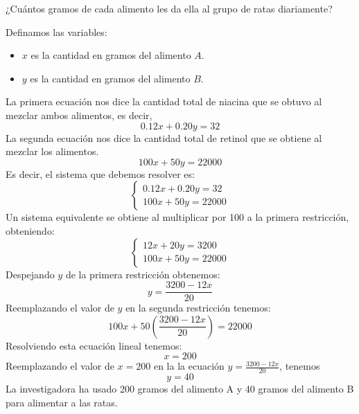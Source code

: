 \documentclass[11pt,respuestas,a4]{aleph-examen}
\begin{document}
\begin{preguntas}
¿Cuántos gramos de cada alimento les da ella al grupo de ratas diariamente? 
\begin{respuesta}
	Definamos las variables:
	\begin{itemize}
		\item[] $x$ es la cantidad en gramos del alimento $A$.
		\item[] $y$ es la cantidad en gramos del alimento $B$.
	\end{itemize}
	La primera ecuaci\'on nos dice la cantidad total de niacina que se obtuvo al mezclar ambos alimentos, es decir,
	$$
	0.12 x + 0.20 y = 32
	$$
	La segunda ecuaci\'on nos dice la cantidad total de retinol que se obtiene al mezclar los alimentos.
	$$
	100 x + 50 y = 22 000
	$$
	Es decir, el sistema que debemos resolver es:
	$$
	\begin{cases}
		0.12 x + 0.20 y = 32 \\
		100 x + 50 y = 22 000
	\end{cases}
	$$
	Un sistema equivalente se obtiene al multiplicar por 100 a la primera restricci\'on, obteniendo:
	$$
	\begin{cases}
		12 x + 20 y = 3200 \\
		100 x + 50 y = 22 000
	\end{cases}
	$$
	Despejando $y$ de la primera restricci\'on obtenemos:
	$$
	y = \frac{3200 - 12x }{20}
	$$
	Reemplazando el valor de $y$ en la segunda restricci\'on tenemos:
	$$
	100 x + 50 \left( \frac{3200 - 12x }{20} \right) = 22000
	$$
	Resolviendo esta ecuaci\'on lineal tenemos:
	$$
	x = 200
	$$
	Reemplazando el valor de $x = 200$ en la la ecuaci\'on $y = \frac{3200 - 12x}{20}$, tenemos
	$$
	y = 40
	$$
	La investigadora ha usado 200 gramos del alimento A y 40 gramos del alimento B para alimentar a las ratas.
\end{respuesta}
\end{preguntas}
\end{document}
